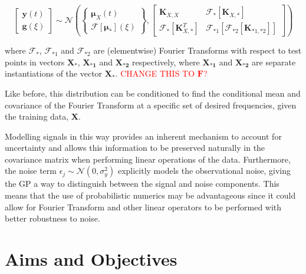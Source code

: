 \documentclass[12pt]{article}
\begin{document}
    \begin{equation}
        \left[
            \begin{array}{c}
                \mathbf{y}(t) \\
                \mathbf{g}(\xi)
            \end{array}
            \right]
        \sim \mathcal{N} \left(
        \left\{
        \begin{array}{c}
            \boldsymbol{\mu}_X(t) \\
            \mathcal{F}[{\boldsymbol{\mu}_*}](\xi)
        \end{array}
        \right\},
        \left[
            \begin{array}{cc}
                \mathbf{K}_{X,X} & \mathcal{F}_{*} [\boldsymbol{K}_{X,*}] \\
                \mathcal{F}_{*} [\boldsymbol{K}_{X,*}^T] & \mathcal{F}_{*1} [\mathcal{F}_{*2} [\boldsymbol{K}_{*1,*2}]]
            \end{array}
            \right]
        \right)\label{eq:linear-trans}
    \end{equation}

    \noindent where $\mathcal{F}_*$, $\mathcal{F}_{*1}$ and $\mathcal{F}_{*2}$ are (elementwise) Fourier Transforms with respect to test points in vectors $\mathbf{X_{*}}$, $\mathbf{X_{*1}}$ and $\mathbf{X_{*2}}$ respectively, where $\mathbf{X_{*1}}$ and $\mathbf{X_{*2}}$ are separate instantiations of the vector $\mathbf{X_{*}}$. \textcolor{red}{CHANGE THIS TO $\mathbf{F}$?}

    Like before, this distribution can be conditioned to find the conditional mean and covariance of the Fourier Transform at a specific set of desired frequencies, given the training data, $\mathbf{X}$.


    Modelling signals in this way provides an inherent mechanism to account for uncertainty and allows this information to be preserved naturally in the covariance matrix when performing linear operations of the data.
    Furthermore, the noise term  $\epsilon_j \sim \mathcal{N}(0, \sigma^2_y)$ explicitly models the observational noise, giving the GP a way to distinguish between the signal and noise components.
    This means that the use of probabilistic numerics may be advantageous since it could allow for Fourier Transform and other linear operators to be performed with better robustness to noise.

    \section{Aims and Objectives}
\end{document}
